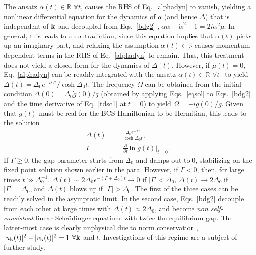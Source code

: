 \documentclass[aps,pra,floats,epsfig,pdflatex]{revtex4}                                                              %
\begin{document}
 {The ansatz $\alpha(t)\in\mathbb{R}$ $\forall t$, causes the RHS of Eq.}~\ref{alphadyn} { to vanish, yielding a nonlinear differential equation for the dynamics of $\alpha$ (and hence $\Delta$) that is independent of ${\bf k}$ and decoupled from Eqs.}~\ref{bdg2} {, $\alpha\ddot{\alpha}-\dot{\alpha}^2-1=2i\alpha^2\dot{\mu}$. In general, this leads to a contradiction, since this equation implies that $\alpha(t)$ picks up an imaginary part, and relaxing the assumption $\alpha(t) \in \mathbb{R}$ causes momentum dependent terms in the RHS of Eq.}~\ref{alphadyn}  {to remain. Thus, this treatment does not yield a closed form for the dynamics of $\Delta(t)$. However, if $\mu(t)=0$, Eq.}~\ref{alphadyn}  {can be readily integrated with the ansatz  $\alpha(t)\in\mathbb{R}$ $\forall t$}~\cite{barankov} { to yield $\Delta(t)=\Delta_0 e^{-i\Omega t}/\cosh{\Delta_0 t}$. The frequency $\Omega$ can be obtained from the initial condition $\dot{\Delta}(0)=\Delta_0 \dot{g}(0)/g$ (obtained by applying Eqs.}~\ref{eqsol}
 {  to Eqs.}~\ref{bdg2}  {and the time derivative of Eq.}~\ref{tdsc1}  {at $t=0$) to yield $\Omega=-i \dot{g}(0)/g$. Given that $g(t)$ must be real for the BCS Hamiltonian to be Hermitian, this leads to the solution}
\begin{eqnarray}
\label{delsoln}
\Delta(t)&=&\frac{\Delta_0 e^{-\Gamma t}}{\cosh{\Delta_0 t}},\nonumber\\
\Gamma   &=& {\frac{\partial}{\partial t}\ln{g(t)}\bigg|_{t=0}}.
\end{eqnarray}
 {If $\Gamma\geq0$, the gap parameter starts from $\Delta_0$ and damps out to $0$, stabilizing on the fixed point solution shown earlier in the para. However, if $\Gamma<0$, then, for large times $t\gg\Delta^{-1}_0$, $\Delta(t)\sim 2\Delta_0 e^{-(\Gamma+\Delta_0)t}\rightarrow 0$ if $|\Gamma|<\Delta_0$, $\Delta(t)\rightarrow 2\Delta_0$ if $|\Gamma|=\Delta_0$, and $\Delta(t)$ blows up if $|\Gamma|>\Delta_0$. The first of the three cases can be readily solved in the asymptotic limit. In the second case, Eqs.}~\ref{bdg2}  {decouple from each other at large times with $\Delta(t)\approx 2\Delta_0$, and become \textit{non self-consistent}  linear Schr\"odinger equations with twice the equilibrium gap. The latter-most case is clearly unphysical due to norm conservation , $|u_{\bf k}(t)|^2+|v_{\bf k}(t)|^2=1$ $\forall {\bf k}$ and $t$. 
Investigations of this regime are a subject of further study.}
\end{document}
